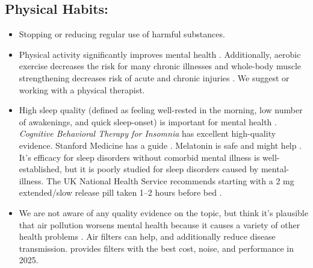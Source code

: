 \documentclass[12pt,letterpaper]{book}
\begin{document}
\subsection*{Physical Habits:}
\begin{itemize}
   \item Stopping or reducing regular use of harmful substances.
   \item Physical activity significantly improves mental health \cite{activityMetaAnalysis}. Additionally, aerobic exercise decreases the risk for many chronic illnesses \cite{liebermanExercised} and whole-body muscle strengthening decreases risk of acute and chronic injuries \cite{lauersenStrength}. We suggest \textcite{lowBodyweight} or working with a physical therapist.
   \item High sleep quality (defined as feeling well-rested in the morning, low number of awakenings, and quick sleep-onset) is important for  mental health \cite{scottSleep}. \textit{Cognitive Behavioral Therapy for Insomnia} has excellent high-quality evidence. Stanford Medicine has a guide \cite{stanfordSleep}. Melatonin is safe and might help \cite{moon2022role}. It's efficacy for sleep disorders without comorbid mental illness is well-established, but it is poorly studied for sleep disorders caused by mental-illness. The UK National Health Service recommends starting with a 2 mg extended/slow release pill taken 1–2 hours before bed \cite{nhsMelatonin}.
   \item We are not aware of any quality evidence on the topic, but think it's plausible that air pollution worsens mental health because it causes a variety of other health problems \cite{airPollution}. Air filters can help, and additionally reduce disease transmission. \textcite{cleanAir} provides filters with the best cost, noise, and performance in 2025.
\end{itemize}
\end{document}
